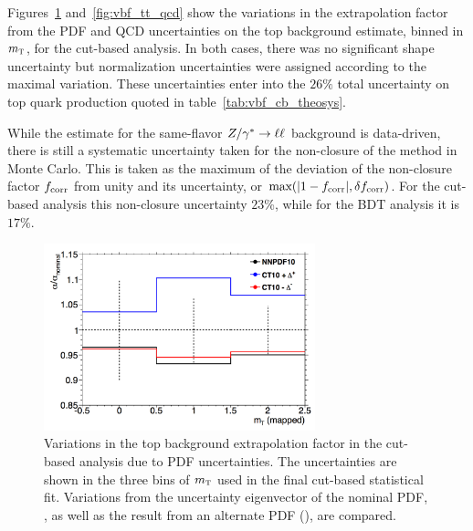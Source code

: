 Figures~\ref{fig:vbf_tt_pdf} and~\ref{fig:vbf_tt_qcd} show the variations in the extrapolation factor from the PDF and QCD uncertainties on the top background estimate, binned in $m_{\textrm{\footnotesize\sc t}}$, for the cut-based analysis. In both cases, there was no significant shape uncertainty but normalization uncertainties were assigned according to the maximal variation. These uncertainties enter into the $26\%$ total uncertainty on top quark production quoted in table~\ref{tab:vbf_cb_theosys}.

While the estimate for the same-flavor $Z/\gamma^{\ast}\to\ell\ell$ background is data-driven, there is still a systematic uncertainty taken for the non-closure of the method in Monte Carlo. This is taken as the maximum of the deviation of the non-closure factor $f_{\rm corr}$ from unity and its uncertainty, or $\textrm{max}(|1 - f_{\rm corr}|, \delta f_{\rm corr})$. For the cut-based analysis this non-closure uncertainty $23$\%, while for the BDT analysis it is $17\%$.

\begin{figure}[h!]
  \centering
  \captionsetup{justification=centering}
  \includegraphics[width=0.7\textwidth]{figures/VBF_cb_tt_pdf}
  \caption{Variations in the top background extrapolation factor in the cut-based analysis due to PDF uncertainties. The uncertainties are shown in the three bins of $m_{\textrm{\footnotesize\sc t}}$ used in the final cut-based statistical fit. Variations from the uncertainty eigenvector of the nominal PDF, , as well as the result from an alternate PDF (), are compared.}
  \label{fig:vbf_tt_pdf}
\end{figure}

